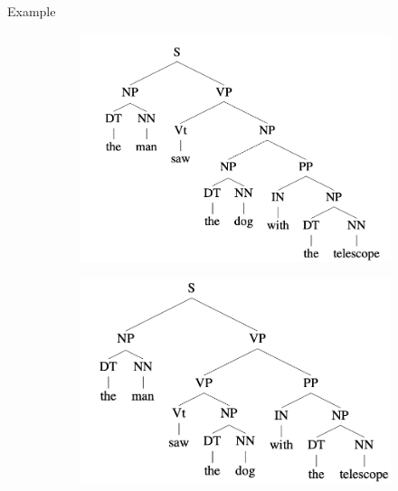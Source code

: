 \documentclass[usenames,dvipsnames,notes,11pt,aspectratio=169]{beamer}
\begin{document}
\begin{frame}
    {Example}
    \begin{figure}
        \begin{subfigure}[b]{0.45\textwidth}
            \includegraphics[width=\textwidth]{figures/parse-1.png}
        \end{subfigure}
        \begin{subfigure}[b]{0.45\textwidth}
            \includegraphics[width=\textwidth]{figures/parse-2.png}
        \end{subfigure}
    \end{figure}
\end{frame}
\end{document}
